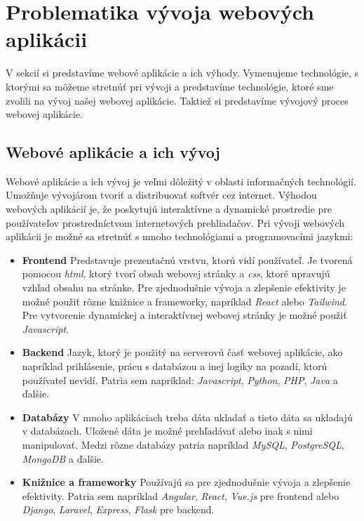 \section{Problematika vývoja webových aplikácii}
\indent \indent V sekcií si predstavíme webové aplikácie a ich výhody. Vymenujeme technológie, s ktorými sa môžeme stretnúť pri vývoji a predstavíme technológie, ktoré sme zvolili na vývoj našej webovej aplikácie. Taktiež si predstavíme vývojový proces webovej aplikácie.
\subsection{Webové aplikácie a ich vývoj}

\indent \indent Webové aplikácie a ich vývoj je veľmi dôležitý v oblasti informačných technológií. Umožňuje vývojárom tvoriť a distribuovať softvér cez internet. Výhodou webových aplikácií je, že poskytujú interaktívne a dynamické prostredie pre používateľov prostredníctvom internetových prehliadačov. Pri vývoji webových aplikácii je možné sa stretnúť s mnoho technológiami a programovacími jazykmi\cite{create_web_app}:
\begin{itemize}
    \item \textbf{Frontend} Predstavuje prezentačnú vrstvu, ktorú vidí používateľ. Je tvorená pomocou \textit{\acrshort{html}}, ktorý tvorí obsah webovej stránky a \textit{\acrshort{css}}, ktoré upravujú vzhľad obsahu na stránke. Pre zjednodušnie vývoja a zlepšenie efektivity je možné použiť rôzne knižnice a frameworky, napríklad  \textit{React}\cite{react} alebo \textit{Tailwind}\cite{tailwind}. Pre vytvorenie dynamickej a interaktívnej webovej stránky je možné použiť \textit{Javascript}\cite{javascript}.
    \item \textbf{Backend} Jazyk, ktorý je použitý na serverovú časť webovej aplikácie, ako napríklad prihlásenie, prácu s databázou a inej logiky na pozadí, ktorú používateľ nevidí. Patria sem napríklad: \textit{Javascript}\cite{javascript}, \textit{Python}\cite{python}, \textit{PHP}\cite{php}, \textit{Java}\cite{java} a ďalšie.
    \item \textbf{Databázy} V mnoho aplikáciach treba dáta ukladať a tieto dáta sa ukladajú v databázach. Uložené dáta je možné prehľadávať alebo inak s nimi manipulovať. Medzi rôzne databázy patria napríklad \textit{MySQL}\cite{mysql}, \textit{PostgreSQL}\cite{postgre}, \textit{MongoDB}\cite{mongodb} a ďalšie.
    \item \textbf{Knižnice a frameworky} Používajú sa pre zjednodušnie vývoja a zlepšenie efektivity. Patria sem napríklad \textit{Angular}\cite{angular}, \textit{React}\cite{react}, \textit{Vue.js}\cite{vuejs} pre frontend alebo \textit{Django}\cite{django}, \textit{Laravel}\cite{laravel}, \textit{Express}\cite{express}, \textit{Flask}\cite{flask} pre backend.
\end{itemize}
